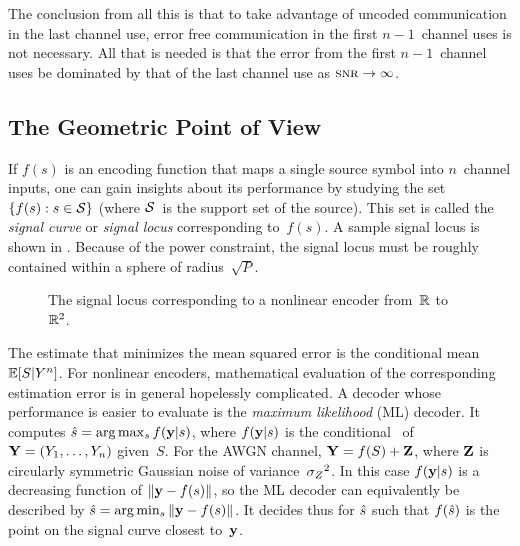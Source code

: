The conclusion from all this is that to take advantage of uncoded communication
in the last channel use, error free communication in the first $n-1$~channel
uses is not necessary. All that is needed is that the error from the first
$n-1$~channel uses be dominated by that of the last channel use as $\snr \goesto
\infty$. 


\subsection{The Geometric Point of View}

If $f(s)$ is an encoding function that maps a single source symbol into
$n$~channel inputs, one can gain insights about its performance by studying the
set $\{f(s): s \in \mathcal{S}\}$ (where $\mathcal{S}$~is the support set of the source). This
set is called the \emph{signal curve} or \emph{signal locus} corresponding
to~$f(s)$. A sample signal locus is shown in . Because of
the power constraint, the signal locus must be roughly contained within a sphere
of radius~$\sqrt{P}$.

\begin{figure}
  \begin{center}
    
  \end{center}
  \caption{The signal locus corresponding to a nonlinear encoder from~$\mathbb{R}$
  to~$\mathbb{R}^2$.}
  \label{fig:nonlinlocus}
\end{figure}

The estimate that minimizes the mean squared error is the conditional mean $\mathbb{E}[S
| Y^n]$. For nonlinear encoders, mathematical evaluation of the corresponding
estimation error is in general hopelessly complicated. A decoder whose
performance is easier to evaluate is the \emph{maximum likelihood} (ML) decoder.
It computes ${\hat{s}} = \arg\max_{s} f(\mathbf{y}|s)$, where $f(\mathbf{y}|s)$ is the conditional
\pdf\ of~$\mathbf{Y} = (Y_1, \dots, Y_n)$ given~$S$. For the AWGN channel, $\mathbf{Y} = f(S) +
\mathbf{Z}$, where $\mathbf{Z}$ is circularly symmetric Gaussian noise of variance~${{\sigma_Z}^2}$. In
this case $f(\mathbf{y}|s)$ is a decreasing function of $\|\mathbf{y} - f(s)\|$, so the ML
decoder can equivalently be described by ${\hat{s}} = \arg\min_{s} \|\mathbf{y} - f(s)\|$. It
decides thus for ${\hat{s}}$ such that $f({\hat{s}})$ is the point on the signal curve
closest to~$\mathbf{y}$. 

